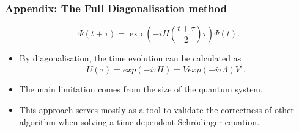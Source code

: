 \documentclass{beamer}
\begin{document}
\begin{frame}
	\frametitle{Appendix: The Full Diagonalisation method}
	\begin{equation*}
	\Psi(t+\tau) =\exp(-iH(\frac{t+\tau}{2})\tau)\Psi(t).
	\end{equation*}
	\begin{itemize}
		\item By diagonalisation, the time evolution can be calculated as 
		\begin{equation*}
		U(\tau) = exp(-i\tau H) = V exp(-i\tau \Lambda) V^\dagger.
		\end{equation*}
		\item The main limitation comes from the size of the quantum system.
		\item This approach serves mostly as a tool to validate the correctness of other algorithm when solving a time-dependent Schrödinger equation.
	\end{itemize}
\end{frame}

\end{document}
